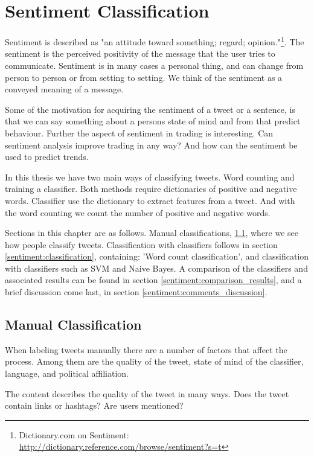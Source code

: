 \chapter{Sentiment Classification}\label{sentiment}
Sentiment is described as "an attitude toward something; regard;
opinion."\footnote{ Dictionary.com on Sentiment:
\url{http://dictionary.reference.com/browse/sentiment?s=t}}. The sentiment is the perceived positivity of the message that the user tries to
communicate. Sentiment is in many cases a personal thing, and can change from
person to person or from setting to setting. We think of the sentiment as a
conveyed meaning of a message. 

Some of the motivation for acquiring the sentiment of a tweet or a sentence, is
that we can say something about a persons state of mind and from that predict
behaviour. Further the aspect of sentiment in trading is interesting. Can
sentiment analysis improve trading in any way? And how can the sentiment be used
to predict trends.

In this thesis we have two main ways of classifying tweets. Word counting and
training a classifier. Both methods require dictionaries of positive and
negative words. Classifier use the dictionary
to extract features from a tweet. And with the word counting we count the
number of positive and negative words. 

Sections in this chapter are as follows. Manual classifications,
\ref{sentiment:manual_classification}, where we see how people classify
tweets. Classification with classifiers follows in section
\ref{sentiment:classification}, containing: 'Word count classification', and
classification with classifiers such as SVM and Naive Bayes. A comparison of the
classifiers and associated results can be found in section
\ref{sentiment:comparison_results}, and a brief discussion come last, in
section \ref{sentiment:comments_discussion}.
%

\section{Manual Classification}\label{sentiment:manual_classification}
When labeling tweets manually there are a number of factors that affect the
process. Among them are the quality of the tweet, state of mind of the
classifier, language, and political affiliation.

The content describes the quality of the tweet in many ways. Does the tweet
contain links or hashtags? Are users mentioned?

